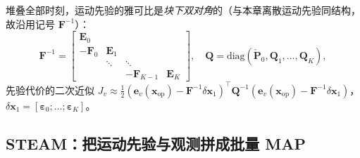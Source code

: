 堆叠全部时刻，运动先验的雅可比是\emph{块下双对角}的（与本章离散运动先验同结构，故沿用记号 $\mathbf{F}^{-1}$）：
\begin{equation}
  \mathbf{F}^{-1}=\begin{bmatrix}\mathbf{E}_0&&&\\-\mathbf{F}_0&\mathbf{E}_1&&\\&\ddots&\ddots&\\&&-\mathbf{F}_{K-1}&\mathbf{E}_K\end{bmatrix},\quad
  \mathbf{Q}=\mathrm{diag}(\check{\mathbf{P}}_0,\mathbf{Q}_1,\dots,\mathbf{Q}_K),
  \label{eq:steam-Finv}
\end{equation}
先验代价的二次近似 $J_v\approx\tfrac12(\mathbf{e}_v(\mathbf{x}_{\mathrm{op}})-\mathbf{F}^{-1}\delta\mathbf{x}_1)^\top\mathbf{Q}^{-1}(\mathbf{e}_v(\mathbf{x}_{\mathrm{op}})-\mathbf{F}^{-1}\delta\mathbf{x}_1)$，$\delta\mathbf{x}_1=[\boldsymbol{\varepsilon}_0;\dots;\boldsymbol{\varepsilon}_K]$。

\subsection{STEAM：把运动先验与观测拼成批量 MAP}
\label{sec:est-steam-map}

